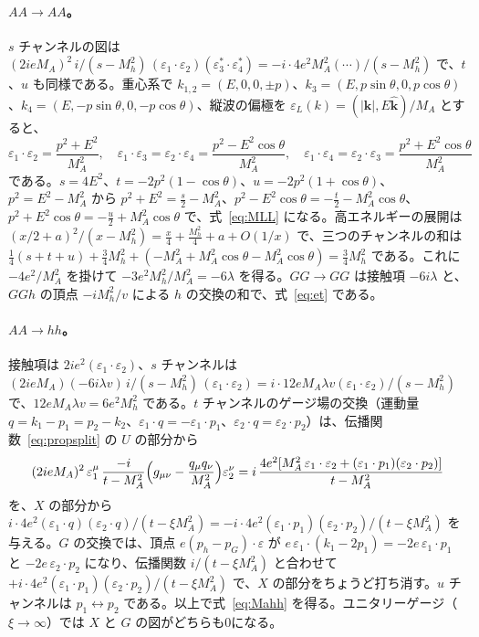 \documentclass[a4paper,10pt]{ltjsarticle}
\begin{document}
\paragraph{$AA\to AA$。}$s$ チャンネルの図は $(2ieM_A)^2\,i/(s-M_h^2)\,(\varepsilon_1\cdot\varepsilon_2)(\varepsilon_3^*\cdot\varepsilon_4^*)=-i\cdot4e^2M_A^2(\cdots)/(s-M_h^2)$ で、$t$、$u$ も同様である。重心系で $k_{1,2}=(E,0,0,\pm p)$、$k_3=(E,p\sin\theta,0,p\cos\theta)$、$k_4=(E,-p\sin\theta,0,-p\cos\theta)$、縦波の偏極を $\varepsilon_L(k)=(|\boldsymbol k|,E\hat{\boldsymbol k})/M_A$ とすると、
\begin{equation*}
\varepsilon_1\cdot\varepsilon_2=\frac{p^2+E^2}{M_A^2},\quad
\varepsilon_1\cdot\varepsilon_3=\varepsilon_2\cdot\varepsilon_4=\frac{p^2-E^2\cos\theta}{M_A^2},\quad
\varepsilon_1\cdot\varepsilon_4=\varepsilon_2\cdot\varepsilon_3=\frac{p^2+E^2\cos\theta}{M_A^2}
\end{equation*}
である。$s=4E^2$、$t=-2p^2(1-\cos\theta)$、$u=-2p^2(1+\cos\theta)$、$p^2=E^2-M_A^2$ から $p^2+E^2=\frac s2-M_A^2$、$p^2-E^2\cos\theta=-\frac t2-M_A^2\cos\theta$、$p^2+E^2\cos\theta=-\frac u2+M_A^2\cos\theta$ で、式~\eqref{eq:MLL} になる。高エネルギーの展開は $(x/2+a)^2/(x-M_h^2)=\frac x4+\frac{M_h^2}4+a+O(1/x)$ で、三つのチャンネルの和は $\frac14(s+t+u)+\frac34M_h^2+(-M_A^2+M_A^2\cos\theta-M_A^2\cos\theta)=\frac34M_h^2$ である。これに $-4e^2/M_A^2$ を掛けて $-3e^2M_h^2/M_A^2=-6\lambda$ を得る。$GG\to GG$ は接触項 $-6i\lambda$ と、$GGh$ の頂点 $-iM_h^2/v$ による $h$ の交換の和で、式~\eqref{eq:et} である。

\paragraph{$AA\to hh$。}接触項は $2ie^2(\varepsilon_1\cdot\varepsilon_2)$、$s$ チャンネルは $(2ieM_A)(-6i\lambda v)\,i/(s-M_h^2)\,(\varepsilon_1\cdot\varepsilon_2)=i\cdot12eM_A\lambda v(\varepsilon_1\cdot\varepsilon_2)/(s-M_h^2)$ で、$12eM_A\lambda v=6e^2M_h^2$ である。$t$ チャンネルのゲージ場の交換（運動量 $q=k_1-p_1=p_2-k_2$、$\varepsilon_1\cdot q=-\varepsilon_1\cdot p_1$、$\varepsilon_2\cdot q=\varepsilon_2\cdot p_2$）は、伝播関数~\eqref{eq:propsplit} の $U$ の部分から
\begin{equation*}
(2ieM_A)^2\,\varepsilon_1^\mu\,\frac{-i}{t-M_A^2}\Bigl(g_{\mu\nu}-\frac{q_\mu q_\nu}{M_A^2}\Bigr)\varepsilon_2^\nu
=i\,\frac{4e^2[M_A^2\,\varepsilon_1\cdot\varepsilon_2+(\varepsilon_1\cdot p_1)(\varepsilon_2\cdot p_2)]}{t-M_A^2}
\end{equation*}
を、$X$ の部分から $i\cdot4e^2(\varepsilon_1\cdot q)(\varepsilon_2\cdot q)/(t-\xi M_A^2)=-i\cdot4e^2(\varepsilon_1\cdot p_1)(\varepsilon_2\cdot p_2)/(t-\xi M_A^2)$ を与える。$G$ の交換では、頂点 $e(p_h-p_G)\cdot\varepsilon$ が $e\,\varepsilon_1\cdot(k_1-2p_1)=-2e\,\varepsilon_1\cdot p_1$ と $-2e\,\varepsilon_2\cdot p_2$ になり、伝播関数 $i/(t-\xi M_A^2)$ と合わせて $+i\cdot4e^2(\varepsilon_1\cdot p_1)(\varepsilon_2\cdot p_2)/(t-\xi M_A^2)$ で、$X$ の部分をちょうど打ち消す。$u$ チャンネルは $p_1\leftrightarrow p_2$ である。以上で式~\eqref{eq:Mahh} を得る。ユニタリーゲージ（$\xi\to\infty$）では $X$ と $G$ の図がどちらも0になる。
\end{document}
